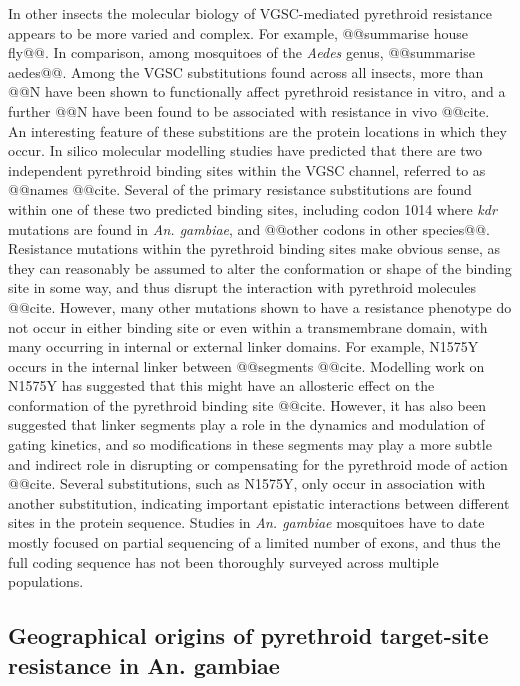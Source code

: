 \documentclass[a4paper,11pt,abstracton,hidelinks]{scrartcl}
\begin{document}
%
In other insects the molecular biology of VGSC-mediated pyrethroid resistance appears to be more varied and complex.
%
For example, @@summarise house fly@@.
%
In comparison, among mosquitoes of the \textit{Aedes} genus, @@summarise aedes@@.
%
Among the VGSC substitutions found across all insects, more than @@N have been shown to functionally affect pyrethroid resistance in vitro, and a further @@N have been found to be associated with resistance in vivo @@cite.
%
An interesting feature of these substitions are the protein locations in which they occur.
%
In silico molecular modelling studies have predicted that there are two independent pyrethroid binding sites within the VGSC channel, referred to as @@names @@cite.
%
Several of the primary resistance substitutions are found within one of these two predicted binding sites, including codon 1014 where \textit{kdr} mutations are found in \textit{An. gambiae}, and @@other codons in other species@@.
%
Resistance mutations within the pyrethroid binding sites make obvious sense, as they can reasonably be assumed to alter the conformation or shape of the binding site in some way, and thus disrupt the interaction with pyrethroid molecules @@cite.
%
However, many other mutations shown to have a resistance phenotype do not occur in either binding site or even within a transmembrane domain, with many occurring in internal or external linker domains.
%
For example, N1575Y occurs in the internal linker between @@segments @@cite.
%
Modelling work on N1575Y has suggested that this might have an allosteric effect on the conformation of the pyrethroid binding site @@cite.
%
However, it has also been suggested that linker segments play a role in the dynamics and modulation of gating kinetics, and so modifications in these segments may play a more subtle and indirect role in disrupting or compensating for the pyrethroid mode of action @@cite.
%
Several substitutions, such as N1575Y, only occur in association with another substitution, indicating important epistatic interactions between different sites in the protein sequence.
%
Studies in \textit{An. gambiae} mosquitoes have to date mostly focused on partial sequencing of a limited number of exons, and thus the full coding sequence has not been thoroughly surveyed across multiple populations.


\subsection*{Geographical origins of pyrethroid target-site resistance in An. gambiae}
\end{document}
